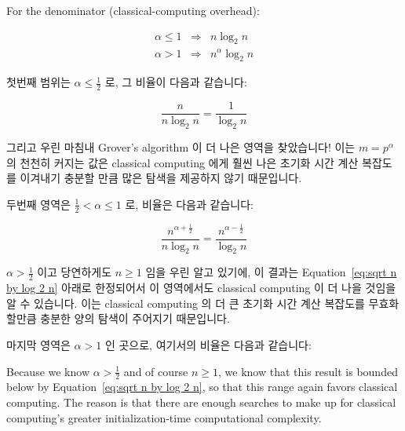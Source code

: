 For the denominator (classical-computing overhead):
\fi

\begin{eqnarray}
	\alpha \leq 1 & \Rightarrow & n \log_2 n \\
	\alpha > 1 & \Rightarrow & n^\alpha \log_2 n
\end{eqnarray}

첫번째 범위는 $\alpha \leq \frac{1}{2}$ 로, 그 비율이 다음과 같습니다:

\begin{equation}
	\frac{n}{n \log_2 n} = \frac{1}{\log_2 n}
\end{equation}

그리고 우린 마침내 Grover's algorithm 이 더 나은 영역을 찾았습니다!
이는 $m = p^\alpha$ 의 천천히 커지는 값은 classical computing 에게 훨씬 나은
초기화 시간 계산 복잡도를 이겨내기 충분할 만큼 많은 탐색을 제공하지 않기
때문입니다.

두번째 영역은 $\frac{1}{2} < \alpha \leq 1$ 로, 비율은 다음과 같습니다:

\begin{equation}
	\frac{n^{\alpha + \frac{1}{2}}}{n \log_2 n} =
	\frac{n^{\alpha - \frac{1}{2}}}{\log_2 n}
\end{equation}

$\alpha > \frac{1}{2}$ 이고 당연하게도 $n \geq 1$ 임을 우린 알고 있기에, 이
결과는
Equation~\ref{eq:sqrt n by log 2 n} 아래로 한정되어서 이 영역에서도 classical
computing 이 더 나을 것임을 알 수 있습니다.
이는 classical computing 의 더 큰 초기화 시간 계산 복잡도를 무효화 할만큼
충분한 양의 탐색이 주어지기 때문입니다.

마지막 영역은 $\alpha > 1$ 인 곳으로, 여기서의 비율은 다음과 같습니다:
\iffalse

Because we know $\alpha > \frac{1}{2}$ and of course $n \geq 1$,
we know that this result is bounded below by
Equation~\ref{eq:sqrt n by log 2 n}, so that this range again
favors classical computing.
The reason is that there are enough searches to make up for
classical computing's greater initialization-time computational
complexity.

